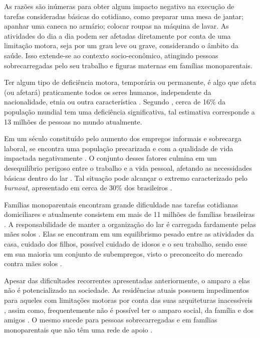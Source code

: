 As razões são inúmeras para obter algum impacto negativo na execução de tarefas consideradas básicas do cotidiano, como preparar uma mesa de jantar;
apanhar uma caneca no armário; colocar roupas na máquina de lavar. As atividades do dia a dia podem ser afetadas diretamente por conta de uma limitação motora, seja
por um grau leve ou grave, considerando o âmbito da saúde. Isso extende-se ao contexto socio-econômico, atingindo pessoas sobrecarregadas pelo seu trabalho e figuras maternas em famílias monoparentais.

Ter algum tipo de deficiência motora, temporária ou permanente, é algo que afeta (ou afetará) praticamente todos os seres humanos, independente da nacionalidade, etnia ou outra característica  \cite{omsDisability:2023}. Segundo \citet{omsDisability:2023}, cerca de 16\% da população mundial tem uma deficiência significativa, tal estimativa corresponde a 13 milhões de pessoas no mundo atualmente.

Em um século constituído pelo aumento dos empregos informais e sobrecarga laboral, se encontra uma população precarizada e com a qualidade
de vida impactada negativamente \cite{precarizacao:2019}. O conjunto desses fatores culmina em um desequilíbrio perigoso entre o trabalho e a
vida pessoal, afetando as necessidades básicas dentro do lar \cite{wbl:2022, precarizacao:2019}. Tal situação pode alcançar o extremo
caracterizado pelo \textit{burnout}, apresentado em cerca de 30\% dos brasileiros \cite{estatisticaBurnout:2023}. 


Famílias monoparentais encontram grande dificuldade nas tarefas cotidianas domiciliares e atualmente consistem em mais de 11 milhões de famílias brasileiras  \cite{globoMaesSolos:2023}. A responsabilidade de manter a organização do lar é carregada fardamente
pelas mães solos \cite{monoparentalidade:2013,maeSoloDireito:2020}. Elas se encontram em um equilibrismo pesado entre as atividades da casa, cuidado dos filhos, possível cuidado de idosos e o seu trabalho, sendo
esse em sua maioria um conjunto de subempregos, visto o preconceito do mercado contra mães solos \cite{maeSoloDireito:2020}.

Apesar das dificultades recorrentes apresentadas anteriormente, o amparo a elas não é potencializado na sociedade.
As residências atuais possuem impedimentos para aqueles com limitações motoras por conta das suas arquiteturas inacessíveis
 \cite{whoHousing:2018}, assim como, frequentemente não é possível ter o amparo social, da família e dos amigos \cite{homeCare:2018}.
O mesmo sucede para pessoas sobrecarregadas e em famílias monoparentais que não têm uma rede de apoio \cite{precarizacao:2019,maeSoloDireito:2020}.


